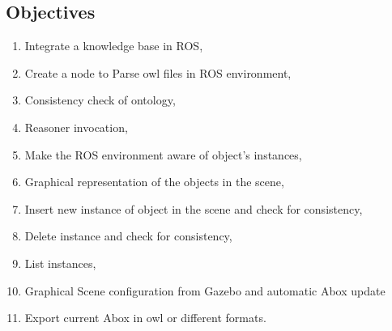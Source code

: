 \subsection{Objectives}
\label{sec:objectives}

\begin{enumerate}
\item Integrate a knowledge base in ROS,
\item Create a node to Parse owl files in ROS environment,
\item Consistency check of ontology,
\item Reasoner invocation,
\item Make the ROS environment aware of object's instances,
\item Graphical representation of the objects in the scene,
\item Insert new instance of object in the scene and check for consistency,
\item Delete instance and check for consistency,
\item List instances,
\item Graphical Scene configuration from Gazebo and automatic Abox update
\item Export current Abox in owl or different formats.
\end{enumerate}

